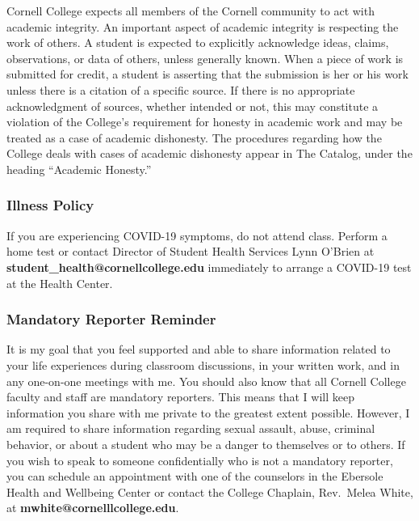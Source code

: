 \documentclass[
  letterpaper,
  DIV=11,
  numbers=noendperiod]{scrartcl}
\begin{document}
Cornell College expects all members of the Cornell community to act with
academic integrity. An important aspect of academic integrity is
respecting the work of others. A student is expected to explicitly
acknowledge ideas, claims, observations, or data of others, unless
generally known. When a piece of work is submitted for credit, a student
is asserting that the submission is her or his work unless there is a
citation of a specific source. If there is no appropriate acknowledgment
of sources, whether intended or not, this may constitute a violation of
the College's requirement for honesty in academic work and may be
treated as a case of academic dishonesty. The procedures regarding how
the College deals with cases of academic dishonesty appear in The
Catalog, under the heading ``Academic Honesty.''

\subsubsection{Illness Policy}\label{illness-policy}

If you are experiencing COVID-19 symptoms, do not attend class. Perform
a home test or contact Director of Student Health Services Lynn O'Brien
at \textbf{student\_health@cornellcollege.edu} immediately to arrange a
COVID-19 test at the Health Center.

\subsubsection{Mandatory Reporter
Reminder}\label{mandatory-reporter-reminder}

It is my goal that you feel supported and able to share information
related to your life experiences during classroom discussions, in your
written work, and in any one-on-one meetings with me. You should also
know that all Cornell College faculty and staff are mandatory reporters.
This means that I will keep information you share with me private to the
greatest extent possible. However, I am required to share information
regarding sexual assault, abuse, criminal behavior, or about a student
who may be a danger to themselves or to others. If you wish to speak to
someone confidentially who is not a mandatory reporter, you can schedule
an appointment with one of the counselors in the Ebersole Health and
Wellbeing Center or contact the College Chaplain, Rev.~Melea White, at
\textbf{mwhite@cornelllcollege.edu}.
\end{document}
